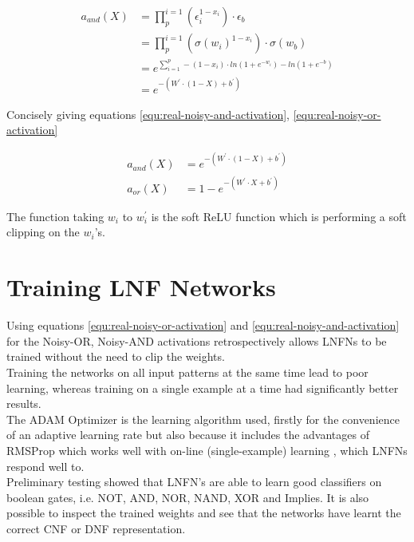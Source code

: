 \begin{align*}
a_{and}(X) &= \prod_{p}^{i=1} (\epsilon_i^{1 - x_i}) \cdot \epsilon_b\\
&= \prod_{p}^{i=1} (\sigma(w_i)^{1 - x_i}) \cdot \sigma(w_b)\\
&= e^{\sum^p_{i=1} -(1 - x_i) \cdot ln(1 + e^{-w_i}) - ln(1 + e^{-b})} \\
&= e^{-(W^{'} \cdot (1 - X) + b^{'})}
\end{align*}

Concisely giving equations \ref{equ:real-noisy-and-activation}, \ref{equ:real-noisy-or-activation}

\begin{align}
a_{and}(X) &= e^{-(W^{'} \cdot (1 - X) + b^{'})} \label{equ:real-noisy-and-activation}\\
a_{or}(X)&= 1 - e^{-(W^{'} \cdot X + b^{'})} \label{equ:real-noisy-or-activation}
\end{align}

The function taking $w_i$ to $w_i^{'}$ is the soft ReLU function which is performing a soft clipping on the $w_i$'s. 

\section{Training LNF Networks}
Using equations \ref{equ:real-noisy-or-activation} and \ref{equ:real-noisy-and-activation} for the Noisy-OR, Noisy-AND activations retrospectively allows LNFNs to be trained without the need to clip the weights.\\

Training the networks on all input patterns at the same time lead to poor learning, whereas training on a single example at a time had significantly better results.\\

The ADAM Optimizer is the learning algorithm used, firstly for the convenience of an adaptive learning rate but also because it includes the advantages of RMSProp which works well with on-line (single-example) learning \cite{kingma2014adam}, which LNFNs respond well to.\\

Preliminary testing showed that LNFN's are able to learn good classifiers on boolean gates, i.e. NOT, AND, NOR, NAND, XOR and Implies. It is also possible to inspect the trained weights and see that the networks have learnt the correct CNF or DNF representation.

